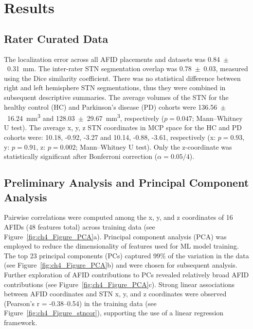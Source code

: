 \section{Results}

\subsection{Rater Curated Data}
The localization error across all AFID placements and datasets was 0.84~$\pm$~0.31~mm. The inter-rater STN segmentation overlap was 0.78~$\pm$~0.03, measured using the Dice similarity coefficient. There was no statistical difference between right and left hemisphere STN segmentations, thus they were combined in subsequent descriptive summaries. The average volumes of the STN for the healthy control (HC) and Parkinson’s disease (PD) cohorts were 136.56~$\pm$~16.24~mm\textsuperscript{3} and 128.03~$\pm$~29.67~mm\textsuperscript{3}, respectively ($p = 0.047$; Mann–Whitney U test). The average x, y, z STN coordinates in MCP space for the HC and PD cohorts were: 10.18, -0.92, -3.27 and 10.14, -0.88, -3.61, respectively (x: $p = 0.93$, y: $p = 0.91$, z: $p = 0.002$; Mann–Whitney U test). Only the z-coordinate was statistically significant after Bonferroni correction ($\alpha = 0.05/4$).

\subsection{Preliminary Analysis and Principal Component Analysis}
Pairwise correlations were computed among the x, y, and z coordinates of 16 AFIDs (48 features total) across training data (see Figure~\ref{fig:ch4_Figure_PCA}a). Principal component analysis (PCA) was employed to reduce the dimensionality of features used for ML model training. The top 23 principal components (PCs) captured 99\% of the variation in the data (see Figure~\ref{fig:ch4_Figure_PCA}b) and were chosen for subsequent analysis. Further exploration of AFID contributions to PCs revealed relatively broad AFID contributions (see Figure~\ref{fig:ch4_Figure_PCA}c). Strong linear associations between AFID coordinates and STN x, y, and z coordinates were observed (Pearson’s r = -0.38–0.54) in the training data (see Figure~\ref{fig:ch4_Figure_stncor}), supporting the use of a linear regression framework.

